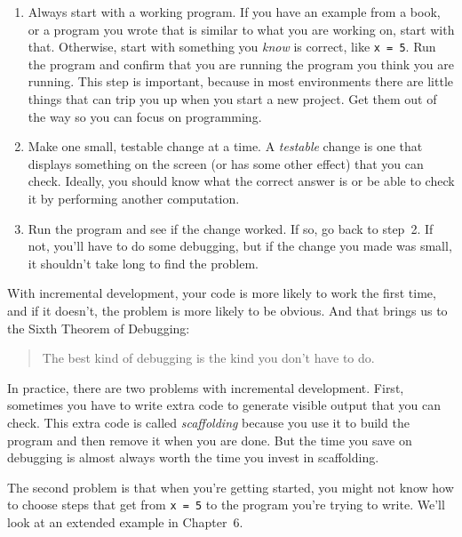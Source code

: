 \begin{enumerate}

\item Always start with a working program.  If you have an
example from a book, or a program you wrote that is similar to
what you are working on, start with that.  Otherwise, start with
something you \emph{know}  is correct, like \lstinline{x = 5}.  Run the program
and confirm that you are running the program you think you are
running.
This step is important, because in most environments there
are little things that can trip you up when you start a new
project.  Get them out of the way so you can focus on programming.

\item Make one small, testable change at a time.  A \emph{testable}
change is one that displays something on the screen (or has some
other effect) that you can check.  Ideally, you should know what
the correct answer is or be able to check it by performing another
computation.

\item Run the program and see if the change worked.  If so, go back
to step~2.  If not, you'll have to do some debugging, but if the
change you made was small, it shouldn't take long to find the problem.

\end{enumerate}


With incremental development, your code is more likely to work the first time, and if it doesn't, the problem is more likely to be obvious.  And that brings us to the Sixth Theorem of Debugging:

\begin{quote}
The best kind of debugging is the kind you don't have to do.
\end{quote}

In practice, there are two problems with incremental development.
First, sometimes you have to write extra code to
generate visible output that you can check.  This extra code is
called \emph{scaffolding} because you use it to build the program
and then remove it when you are done.  But the time you save on
debugging is almost always worth the time you invest in
scaffolding.

The second problem is that when you're getting started, you might not know how to
choose steps that get from \lstinline{x = 5} to the program you're trying
to write.  We'll look at an extended example in Chapter~6.


